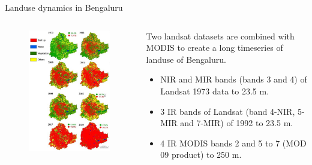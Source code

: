 \documentclass[aspectratio=169]{beamer} %
\begin{document}
\begin{frame}{Landuse dynamics in Bengaluru}
  \begin{columns}
    \begin{column}{0.45\textwidth}
      \begin{minipage}[c][0.7\textheight][c]{\linewidth}
        \begin{figure}
          \includegraphics[width=0.75\linewidth]{banglore_vertical.png}
        \end{figure}
      \end{minipage}
    \end{column}
    \begin{column}{0.55\textwidth}
      \begin{minipage}[c][0.6\textheight][c]{\linewidth}
        Two landsat datasets are combined with MODIS to create a long timeseries of landuse of Bengaluru. 
        \begin{itemize}
          \item NIR and MIR bands (bands 3 and 4) of Landsat 1973 data to 23.5 m. 
          \item 3 IR bands of Landsat (band 4-NIR, 5-MIR and 7-MIR) of 1992 to 23.5 m.
          \item 4 IR MODIS bands 2 and 5 to 7 (MOD 09 product) to 250 m.
        \end{itemize}
      \end{minipage}
    \end{column}
  \end{columns}
\end{frame}
\end{document}
